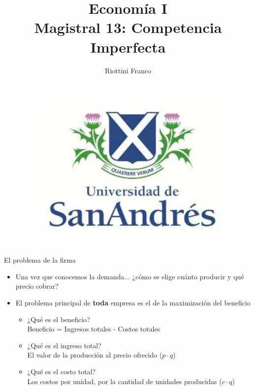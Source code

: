 \documentclass{beamer}
\title[Economía I]{Economía I \vspace{4mm}
\\ Magistral 13: Competencia Imperfecta}
\date{}
\author[Riottini]{Riottini Franco}
\institute[]{Universidad de San Andrés}
\begin{document}
\begin{frame}
    \titlepage
    \centering
    \includegraphics[scale=0.2]{../Figures/logoUDESA.jpg} 
\end{frame}


\begin{frame}{El problema de la firma}
    \begin{itemize}
        \item Una vez que conocemos la demanda... ¿cómo se elige cuánto producir y qué precio cobrar?
        \vspace{1mm}
        \item El problema principal de \textbf{toda} empresa es el de la maximización del beneficio
        \vspace{1mm}     
        \begin{itemize}
            \item ¿Qué es el beneficio? \vspace{1mm} \\ 
            Beneficio = Ingresos totales - Costos totales
            \vspace{1mm}
            \item ¿Qué es el ingreso total? 
            \vspace{1mm} \\ 
            El valor de la producción al precio ofrecido ($p \cdot q$)
            \vspace{1mm}
            \item ¿Qué es el costo total?
            \vspace{1mm} \\ 
            Los costos por unidad, por la cantidad de unidades producidas ($c \cdot q$)
        \end{itemize} 
    \end{itemize} 
\end{frame}
\end{document}

